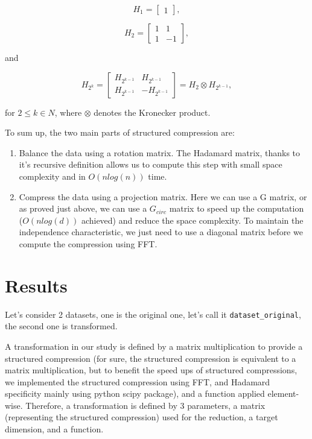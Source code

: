 \documentclass[11pt,a4paper]{article}
\begin{document}
	
	\[
	H_1 = \begin{bmatrix}
		1      \end{bmatrix},
	\]
	
	\[
	H_2 = \begin{bmatrix}
		1 &  1 \\
		1 & -1 \end{bmatrix},
	\]
	
	and
	
	\[
	H_{2^k} = \begin{bmatrix}
		H_{2^{k-1}} &  H_{2^{k-1}}\\
		H_{2^{k-1}}  & -H_{2^{k-1}}\end{bmatrix} = H_2\otimes H_{2^{k-1}},
	\]
	
	for $ 2 \le k \in N $, where $ \left.\otimes\right. $ denotes the Kronecker product.
	
	
	
	To sum up, the two main parts of structured compression are:
	\begin{enumerate}
		\item Balance the data using a rotation matrix. The Hadamard matrix, thanks to it's recursive definition allows us to compute this step with small space complexity and in $O(nlog(n))$ time.
		\item Compress the data using a projection matrix. Here we can use a G matrix, or as proved just above, we can use a $G_{circ}$ matrix to speed up the computation ($O(nlog(d))$ achieved) and reduce the space complexity. To maintain the independence characteristic, we just need to use a diagonal matrix before we compute the compression using FFT.
	\end{enumerate}

	

	
	
	
	\section{Results}
	
	
	Let's consider 2 datasets, one is the original one, let's call it \texttt{dataset\_original}, the second one is transformed.
	
		A transformation in our study is defined by a matrix multiplication to provide a structured compression (for sure, the structured compression is equivalent to a matrix multiplication, but to benefit the speed ups of structured compressions, we implemented the structured compression using FFT, and Hadamard specificity mainly using python scipy package), and a function applied element-wise. Therefore, a transformation is defined by 3 parameters, a matrix (representing the structured compression) used for the reduction, a target dimension, and a function.
		
\end{document}
